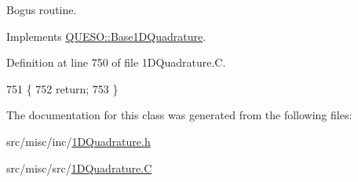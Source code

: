 Bogus routine. 



Implements \hyperlink{class_q_u_e_s_o_1_1_base1_d_quadrature_a37bdd63ba8b986e02d47b05fc8795332}{Q\-U\-E\-S\-O\-::\-Base1\-D\-Quadrature}.



Definition at line 750 of file 1\-D\-Quadrature.\-C.


\begin{DoxyCode}
751 \{
752   \textcolor{keywordflow}{return};
753 \}
\end{DoxyCode}


The documentation for this class was generated from the following files\-:\begin{DoxyCompactItemize}
\item 
src/misc/inc/\hyperlink{1_d_quadrature_8h}{1\-D\-Quadrature.\-h}\item 
src/misc/src/\hyperlink{1_d_quadrature_8_c}{1\-D\-Quadrature.\-C}\end{DoxyCompactItemize}
